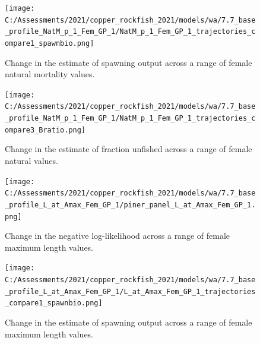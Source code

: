 \documentclass[11pt,
  english,
  a4paper,
]{article}
\begin{document}
\tagmcend\tagstructend


\begin{figure}
\centering
\texttt{[image: C:/Assessments/2021/copper\_rockfish\_2021/models/wa/7.7\_base\_profile\_NatM\_p\_1\_Fem\_GP\_1/NatM\_p\_1\_Fem\_GP\_1\_trajectories\_compare1\_spawnbio.png]}
\caption{Change in the estimate of spawning output across a range of female natural mortality values.\label{fig:m-ssb}}
\end{figure}

\tagmcend\tagstructend


\begin{figure}
\centering
\texttt{[image: C:/Assessments/2021/copper\_rockfish\_2021/models/wa/7.7\_base\_profile\_NatM\_p\_1\_Fem\_GP\_1/NatM\_p\_1\_Fem\_GP\_1\_trajectories\_compare3\_Bratio.png]}
\caption{Change in the estimate of fraction unfished across a range of female natural values.\label{fig:m-depl}}
\end{figure}

\tagmcend\tagstructend


\begin{figure}
\centering
\texttt{[image: C:/Assessments/2021/copper\_rockfish\_2021/models/wa/7.7\_base\_profile\_L\_at\_Amax\_Fem\_GP\_1/piner\_panel\_L\_at\_Amax\_Fem\_GP\_1.png]}
\caption{Change in the negative log-likelihood across a range of female maximum length values.\label{fig:linf-profile}}
\end{figure}

\tagmcend\tagstructend


\begin{figure}
\centering
\texttt{[image: C:/Assessments/2021/copper\_rockfish\_2021/models/wa/7.7\_base\_profile\_L\_at\_Amax\_Fem\_GP\_1/L\_at\_Amax\_Fem\_GP\_1\_trajectories\_compare1\_spawnbio.png]}
\caption{Change in the estimate of spawning output across a range of female maximum length values.\label{fig:linf-ssb}}
\end{figure}
\end{document}
